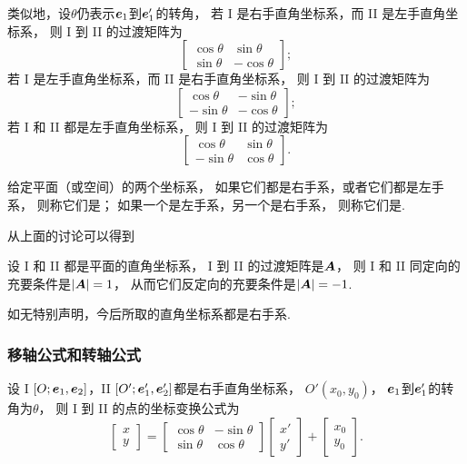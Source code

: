 类似地，设\(\theta\)仍表示\(\boldsymbol{e}_1\)到\(\boldsymbol{e}_1'\)的转角，
若 I 是右手直角坐标系，而 II 是左手直角坐标系，
则 I 到 II 的过渡矩阵为\[
	\begin{bmatrix}
		\cos\theta & \sin\theta \\
		\sin\theta & -\cos\theta
	\end{bmatrix};
\]
若 I 是左手直角坐标系，而 II 是右手直角坐标系，
则 I 到 II 的过渡矩阵为\[
	\begin{bmatrix}
		\cos\theta & -\sin\theta \\
		-\sin\theta & -\cos\theta
	\end{bmatrix};
\]
若 I 和 II 都是左手直角坐标系，
则 I 到 II 的过渡矩阵为\[
	\begin{bmatrix}
		\cos\theta & \sin\theta \\
		-\sin\theta & \cos\theta
	\end{bmatrix}.
\]

\begin{definition}
给定平面（或空间）的两个坐标系，
如果它们都是右手系，或者它们都是左手系，
则称它们是；
如果一个是左手系，另一个是右手系，
则称它们是.
\end{definition}

从上面的讨论可以得到
\begin{theorem}
设 I 和 II 都是平面的直角坐标系，
I 到 II 的过渡矩阵是\(\boldsymbol{A}\)，
则 I 和 II 同定向的充要条件是\(\abs{\boldsymbol{A}}=1\)，
从而它们反定向的充要条件是\(\abs{\boldsymbol{A}}=-1\).
\end{theorem}

如无特别声明，今后所取的直角坐标系都是右手系.

\subsubsection{移轴公式和转轴公式}
设 I \([O;\boldsymbol{e}_1,\boldsymbol{e}_2]\)，II \([O';\boldsymbol{e}_1',\boldsymbol{e}_2']\)都是右手直角坐标系，
\(O'(x_0,y_0)\)，
\(\boldsymbol{e}_1\)到\(\boldsymbol{e}_1'\)的转角为\(\theta\)，
则 I 到 II 的点的坐标变换公式为
\begin{equation}\label{equation:解析几何.平面坐标系的点的右手直角坐标变换公式I到II.矩阵形式1}
	\begin{bmatrix}
		x \\ y
	\end{bmatrix} = \begin{bmatrix}
		\cos\theta & -\sin\theta \\
		\sin\theta & \cos\theta
	\end{bmatrix} \begin{bmatrix}
		x' \\ y'
	\end{bmatrix} + \begin{bmatrix}
		x_0 \\ y_0
	\end{bmatrix}.
\end{equation}

